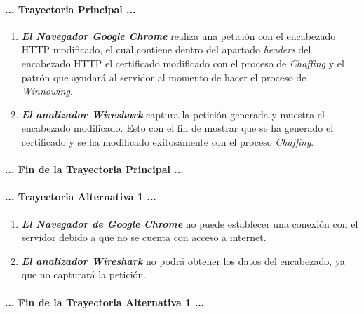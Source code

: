 \documentclass[12pt, a4paper, titlepage]{report}
\begin{document}
				\paragraph{... Trayectoria Principal ...}
				\begin{enumerate}
					\item \textbf{\textit{El Navegador Google Chrome}} realiza una petición con el encabezado HTTP modificado, el cual contiene dentro del apartado \textit{headers} del encabezado HTTP el certificado modificado con el proceso de \textit{Chaffing} y el patrón que ayudará al servidor al momento de hacer el proceso de \textit{Winnowing}.
					\item \textbf{\textit{El analizador Wireshark}} captura la petición generada y muestra el encabezado modificado. Esto con el fin de mostrar que se ha generado el certificado y se ha modificado exitosamente con el proceso \textit{Chaffing}.				
					\end{enumerate}
				\paragraph{... Fin de la Trayectoria Principal ...}
				
				\paragraph{... Trayectoria Alternativa 1 ...}
				\begin{enumerate}
					\item \textbf{\textit{El Navegador de Google Chrome}} no puede establecer una conexión con el servidor debido a que no se cuenta con acceso a internet.
					\item \textbf{\textit{El analizador Wireshark}} no podrá obtener los datos del encabezado, ya que no capturará la petición.
				\end{enumerate}
				\paragraph{... Fin de la Trayectoria Alternativa 1 ...}
			
			\newpage
				
\end{document}
